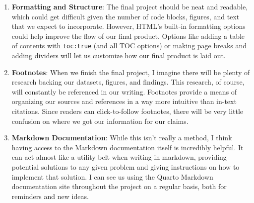 \documentclass[
  letterpaper,
  DIV=11,
  numbers=noendperiod]{scrartcl}
\providecommand{\tightlist}{%
  \setlength{\itemsep}{0pt}\setlength{\parskip}{0pt}}\usepackage{longtable,booktabs,array}
\begin{document}
\begin{enumerate}
\def\labelenumi{\arabic{enumi}.}
\tightlist
\item
  \textbf{Formatting and Structure}: The final project should be neat
  and readable, which could get difficult given the number of code
  blocks, figures, and text that we expect to incorporate. However,
  HTML's built-in formatting options could help improve the flow of our
  final product. Options like adding a table of contents with
  \texttt{toc:true} (and all TOC options) or making page breaks and
  adding dividers will let us customize how our final product is laid
  out.
\item
  \textbf{Footnotes}: When we finish the final project, I imagine there
  will be plenty of research backing our datasets, figures, and
  findings. This research, of course, will constantly be referenced in
  our writing. Footnotes provide a means of organizing our sources and
  references in a way more intuitive than in-text citations. Since
  readers can click-to-follow footnotes, there will be very little
  confusion on where we got our information for our claims.
\item
  \textbf{Markdown Documentation}: While this isn't really a method, I
  think having access to the Markdown documentation itself is incredibly
  helpful. It can act almost like a utility belt when writing in
  markdown, providing potential solutions to any given problem and
  giving instructions on how to implement that solution. I can see us
  using the Quarto Markdown documentation site throughout the project on
  a regular basis, both for reminders and new ideas.
\end{enumerate}
\end{document}
